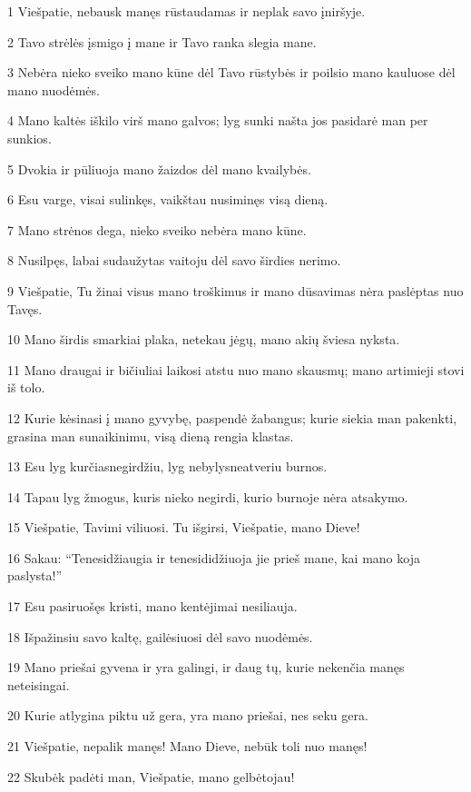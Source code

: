 \par 1 Viešpatie, nebausk manęs rūstaudamas ir neplak savo įniršyje. 
\par 2 Tavo strėlės įsmigo į mane ir Tavo ranka slegia mane. 
\par 3 Nebėra nieko sveiko mano kūne dėl Tavo rūstybės ir poilsio mano kauluose dėl mano nuodėmės. 
\par 4 Mano kaltės iškilo virš mano galvos; lyg sunki našta jos pasidarė man per sunkios. 
\par 5 Dvokia ir pūliuoja mano žaizdos dėl mano kvailybės. 
\par 6 Esu varge, visai sulinkęs, vaikštau nusiminęs visą dieną. 
\par 7 Mano strėnos dega, nieko sveiko nebėra mano kūne. 
\par 8 Nusilpęs, labai sudaužytas vaitoju dėl savo širdies nerimo. 
\par 9 Viešpatie, Tu žinai visus mano troškimus ir mano dūsavimas nėra paslėptas nuo Tavęs. 
\par 10 Mano širdis smarkiai plaka, netekau jėgų, mano akių šviesa nyksta. 
\par 11 Mano draugai ir bičiuliai laikosi atstu nuo mano skausmų; mano artimieji stovi iš tolo. 
\par 12 Kurie kėsinasi į mano gyvybę, paspendė žabangus; kurie siekia man pakenkti, grasina man sunaikinimu, visą dieną rengia klastas. 
\par 13 Esu lyg kurčias­negirdžiu, lyg nebylys­neatveriu burnos. 
\par 14 Tapau lyg žmogus, kuris nieko negirdi, kurio burnoje nėra atsakymo. 
\par 15 Viešpatie, Tavimi viliuosi. Tu išgirsi, Viešpatie, mano Dieve! 
\par 16 Sakau: “Tenesidžiaugia ir tenesididžiuoja jie prieš mane, kai mano koja paslysta!” 
\par 17 Esu pasiruošęs kristi, mano kentėjimai nesiliauja. 
\par 18 Išpažinsiu savo kaltę, gailėsiuosi dėl savo nuodėmės. 
\par 19 Mano priešai gyvena ir yra galingi, ir daug tų, kurie nekenčia manęs neteisingai. 
\par 20 Kurie atlygina piktu už gera, yra mano priešai, nes seku gera. 
\par 21 Viešpatie, nepalik manęs! Mano Dieve, nebūk toli nuo manęs! 
\par 22 Skubėk padėti man, Viešpatie, mano gelbėtojau!



